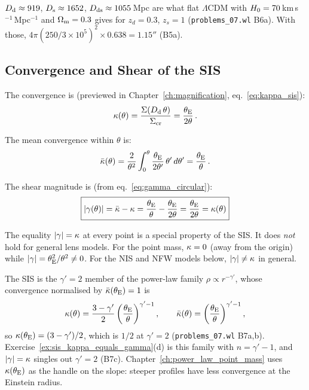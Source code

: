 \begin{annotation}
$D_{\mathrm{d}}\approx919$, $D_{\mathrm{s}}\approx1652$, $D_{\mathrm{ds}}\approx1055$\,Mpc are what flat
$\Lambda$CDM with $H_0 = 70$\,km\,s$^{-1}$\,Mpc$^{-1}$ and $\Omega_{\mathrm{m}} = 0.3$ gives for
$z_d = 0.3$, $z_s = 1$ (\texttt{problems\_07.wl} B6a).  With those,
$4\pi(250/3\times10^5)^2\times0.638 = 1.15''$ (B5a).
\end{annotation}

\subsection{Convergence and Shear of the SIS}

The convergence is (previewed in Chapter~\ref{ch:magnification},
eq.~\ref{eq:kappa_sis}):
\begin{equation}
    \kappa(\theta) = \frac{\Sigma(D_{\mathrm{d}}\,\theta)}{\Sigma_{\mathrm{cr}}}
    = \frac{\theta_{\mathrm{E}}}{2\theta} \,.
    \label{eq:sis_kappa}
\end{equation}

The mean convergence within $\theta$ is:
\begin{equation}
    \bar{\kappa}(\theta) = \frac{2}{\theta^2}
    \int_0^\theta \frac{\theta_{\mathrm{E}}}{2\theta'}\, \theta'\, d\theta'
    = \frac{\theta_{\mathrm{E}}}{\theta} \,.
    \label{eq:sis_mean_kappa}
\end{equation}

The shear magnitude is (from eq.~\ref{eq:gamma_circular}):
\begin{equation}
    \boxed{
    |\gamma(\theta)| = \bar{\kappa} - \kappa
    = \frac{\theta_{\mathrm{E}}}{\theta} - \frac{\theta_{\mathrm{E}}}{2\theta}
    = \frac{\theta_{\mathrm{E}}}{2\theta}
    = \kappa(\theta)
    }
    \label{eq:sis_gamma}
\end{equation}

\begin{remark}
The equality $|\gamma| = \kappa$ at every point is a special
property of the SIS\@.  It does \textit{not} hold for general lens
models.  For the point mass, $\kappa = 0$ (away from the origin)
while $|\gamma| = \theta_{\mathrm{E}}^2/\theta^2 \neq 0$.  For the NIS and NFW
models below, $|\gamma| \neq \kappa$ in general.
\end{remark}

\begin{bridge}[$\kappab(\thetaE) = 1/2$ is the $\gamma' = 2$ case]
The SIS is the $\gamma' = 2$ member of the power-law family
$\rho\propto r^{-\gamma'}$, whose convergence normalised by $\bar\kappa(\theta_{\mathrm{E}}) = 1$ is
\[
  \kappa(\theta) = \frac{3-\gamma'}{2}\left(\frac{\theta_{\mathrm{E}}}{\theta}\right)^{\gamma'-1},
  \qquad
  \bar\kappa(\theta) = \left(\frac{\theta_{\mathrm{E}}}{\theta}\right)^{\gamma'-1},
\]
so $\kappa(\theta_{\mathrm{E}}) = (3-\gamma')/2$, which is $1/2$ at $\gamma' = 2$
(\texttt{problems\_07.wl} B7a,b).  Exercise~\ref{ex:sis_kappa_equals_gamma}(d)
is this family with $n = \gamma'-1$, and $|\gamma| = \kappa$ singles out
$\gamma' = 2$ (B7c).  Chapter~\ref{ch:power_law_point_mass} uses $\kappa(\theta_{\mathrm{E}})$
as the handle on the slope: steeper profiles have less convergence at the
Einstein radius.
\end{bridge}

